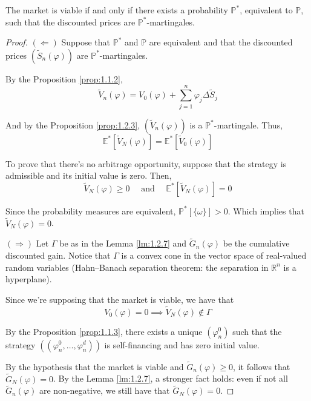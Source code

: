 \begin{theorem}\label{thm:fund_thm_asset}
    The market is viable if and only if there exists a probability $\mathbb{P}^\ast$, equivalent to $\mathbb{P}$, such that the discounted prices are $\mathbb{P}^\ast$-martingales.
\end{theorem}

\begin{proof}
    $(\Leftarrow)$ Suppose that $\mathbb{P}^\ast$ and $\mathbb{P}$ are equivalent and that the discounted prices $(\tilde{S}_n(\varphi))$ are $\mathbb{P}^\ast$-martingales. 

    By the Proposition \ref{prop:1.1.2},
    \[
        \tilde{V}_n(\varphi) = V_0(\varphi) + \sum_{j=1}^{n} \varphi_j \Delta \tilde{S}_j
    \]

    And by the Proposition \ref{prop:1.2.3}, $(\tilde{V}_n(\varphi))$ is a $\mathbb{P}^\ast$-martingale. Thus,
    \[
        \mathbb{E}^\ast[\tilde{V}_N(\varphi)] = \mathbb{E}^\ast[\tilde{V}_0(\varphi)]
    \]

    To prove that there's no arbitrage opportunity, suppose that the strategy is admissible and its initial value is zero. Then,
    \[
        \tilde{V}_N(\varphi) \ge 0 \quad \text{ and } \quad \mathbb{E}^\ast[\tilde{V}_N(\varphi)] = 0
    \]

    Since the probability measures are equivalent, $\mathbb{P}^\ast[\{\omega\}] > 0$. Which implies that $\tilde{V}_N(\varphi) = 0$.

    $(\Rightarrow)$ Let $\Gamma$ be as in the Lemma \ref{lm:1.2.7} and $\tilde{G}_n(\varphi)$ be the cumulative discounted gain. Notice that $\Gamma$ is a convex cone in the vector space of real-valued random variables (Hahn–Banach separation theorem: the separation in $\mathbb{R}^n$ is a hyperplane). 

    Since we're supposing that the market is viable, we have that
    \[
        V_0(\varphi) = 0 \implies \tilde{V}_N(\varphi) \notin \Gamma
    \]

    By the Proposition \ref{prop:1.1.3}, there exists a unique $(\varphi_n^0)$ such that the strategy $((\varphi_n^0, \ldots, \varphi_n^d))$ is self-financing and has zero initial value. 

    By the hypothesis that the market is viable and $\tilde{G}_n(\varphi) \geq 0$, it follows that $\tilde{G}_N(\varphi) = 0$. By the Lemma \ref{lm:1.2.7}, a stronger fact holds: even if not all $\tilde{G}_n(\varphi)$ are non-negative, we still have that $\tilde{G}_N(\varphi) = 0$.


\end{proof}
